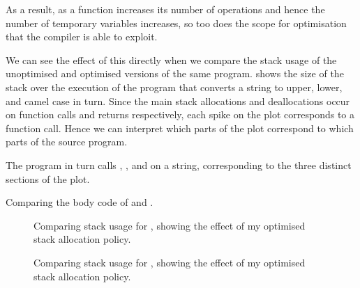 \documentclass[00-main.tex]{subfiles}
\begin{document}
As a result, as a function increases its number of operations and hence the number of temporary variables increases, so too does the scope for optimisation that the compiler is able to exploit.

We can see the effect of this directly when we compare the stack usage of the unoptimised and optimised versions of the same program.
 shows the size of the stack over the execution of the  program that converts a string to upper, lower, and camel case in turn.
Since the main stack allocations and deallocations occur on function calls and returns respectively, each spike on the plot corresponds to a function call.
Hence we can interpret which parts of the plot correspond to which parts of the source program.

The program in turn calls , , and  on a string, corresponding to the three distinct sections of the plot.

\begin{listing}[p]
  \hfill
  \par\smallskip
  \caption{Comparing the body code of  and .\bigskip}
  \label{lst:caseupper and casecamel body code}
\end{listing}

\begin{figure}[p]
  \centering
  \caption{Comparing stack usage for , showing the effect of my optimised stack allocation policy.}
  \label{fig:comparing stack usage for case.c} %
\end{figure}

\begin{figure}[p]
  \centering
  \caption{Comparing stack usage for , showing the effect of my optimised stack allocation policy.}
  \label{fig:comparing stack usage for fibonacci.c} %
\end{figure}
\end{document}
